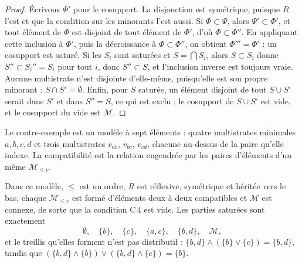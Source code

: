 \begin{proof}
Écrivons $\Phi'$ pour le cosupport. La disjonction est symétrique, puisque $R$ l'est et que la condition sur les minorants l'est aussi. Si $\Phi \subset \Psi$, alors $\Psi' \subset \Phi'$, et tout élément de $\Phi$ est disjoint de tout élément de $\Phi'$, d'où $\Phi \subset \Phi''$. En appliquant cette inclusion à $\Phi'$, puis la décroissance à $\Phi \subset \Phi''$, on obtient $\Phi''' = \Phi'$ : un cosupport est saturé. Si les $S_i$ sont saturées et $S = \bigcap S_i$, alors $S \subset S_i$ donne $S'' \subset S_i'' = S_i$ pour tout $i$, donc $S'' \subset S$, et l'inclusion inverse est toujours vraie. Aucune multistrate n'est disjointe d'elle-même, puisqu'elle est son propre minorant : $S \cap S' = \emptyset$. Enfin, pour $S$ saturée, un élément disjoint de tout $S \cup S'$ serait dans $S'$ et dans $S'' = S$, ce qui est exclu ; le cosupport de $S \cup S'$ est vide, et le cosupport du vide est $\mathcal M$.
\end{proof}

Le contre-exemple est un modèle à sept éléments : quatre multistrates minimales $a, b, c, d$ et trois multistrates $v_{ab}$, $v_{bc}$, $v_{cd}$, chacune au-dessus de la paire qu'elle indexe. La compatibilité est la relation engendrée par les paires d'éléments d'un même $\mathcal M_{\leq v}$.
\begin{center}
\end{center}

\begin{encadre}
\begin{contrexemple}
Dans ce modèle, $\leq$ est un ordre, $R$ est réflexive, symétrique et héritée vers le bas, chaque $\mathcal M_{\leq v}$ est formé d'éléments deux à deux compatibles et $\mathcal M$ est connexe, de sorte que la condition C\,4 est vide. Les parties saturées sont exactement
\[
\emptyset, \quad \{b\}, \quad \{c\}, \quad \{a, c\}, \quad \{b, d\}, \quad \mathcal M,
\]
et le treillis qu'elles forment n'est pas distributif : $\{b, d\} \wedge (\{b\} \vee \{c\}) = \{b, d\}$, tandis que $(\{b, d\} \wedge \{b\}) \vee (\{b, d\} \wedge \{c\}) = \{b\}$.
\end{contrexemple}
\end{encadre}

